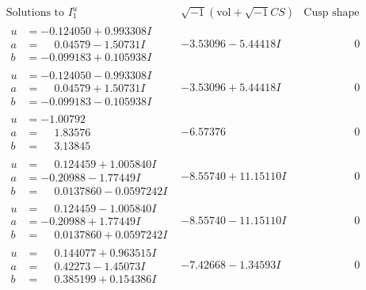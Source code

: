 \documentclass[1p]{elsarticle_modified}
\theoremstyle{definition}
\newcommand{\I}{\sqrt{-1}}
\begin{document}
$$\begin{array}{c|c|c}  
\text{Solutions to }I^u_{1}& \I (\text{vol} + \sqrt{-1}CS) & \text{Cusp shape}\\
 \hline 
\begin{aligned}
u &= -0.124050 + 0.993308 I \\
a &= \phantom{-}0.04579 - 1.50731 I \\
b &= -0.099183 + 0.105938 I\end{aligned}
 & -3.53096 - 5.44418 I & \phantom{-0.000000 } 0 \\ \hline\begin{aligned}
u &= -0.124050 - 0.993308 I \\
a &= \phantom{-}0.04579 + 1.50731 I \\
b &= -0.099183 - 0.105938 I\end{aligned}
 & -3.53096 + 5.44418 I & \phantom{-0.000000 } 0 \\ \hline\begin{aligned}
u &= -1.00792\phantom{ +0.000000I} \\
a &= \phantom{-}1.83576\phantom{ +0.000000I} \\
b &= \phantom{-}3.13845\phantom{ +0.000000I}\end{aligned}
 & -6.57376\phantom{ +0.000000I} & \phantom{-0.000000 } 0 \\ \hline\begin{aligned}
u &= \phantom{-}0.124459 + 1.005840 I \\
a &= -0.20988 - 1.77449 I \\
b &= \phantom{-}0.0137860 - 0.0597242 I\end{aligned}
 & -8.55740 + 11.15110 I & \phantom{-0.000000 } 0 \\ \hline\begin{aligned}
u &= \phantom{-}0.124459 - 1.005840 I \\
a &= -0.20988 + 1.77449 I \\
b &= \phantom{-}0.0137860 + 0.0597242 I\end{aligned}
 & -8.55740 - 11.15110 I & \phantom{-0.000000 } 0 \\ \hline\begin{aligned}
u &= \phantom{-}0.144077 + 0.963515 I \\
a &= \phantom{-}0.42273 - 1.45073 I \\
b &= \phantom{-}0.385199 + 0.154386 I\end{aligned}
 & -7.42668 - 1.34593 I & \phantom{-0.000000 } 0 \\ \hline\begin{aligned}

\end{aligned}
\end{array}$$
\end{document}
